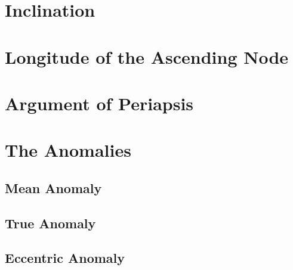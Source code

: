 \documentclass[]{book}
\begin{document}



\section{Inclination}

\section{Longitude of the Ascending Node}

\section{Argument of Periapsis}

\section{The Anomalies}

\subsection{Mean Anomaly}

\subsection{True Anomaly}

\subsection{Eccentric Anomaly}
\end{document}

